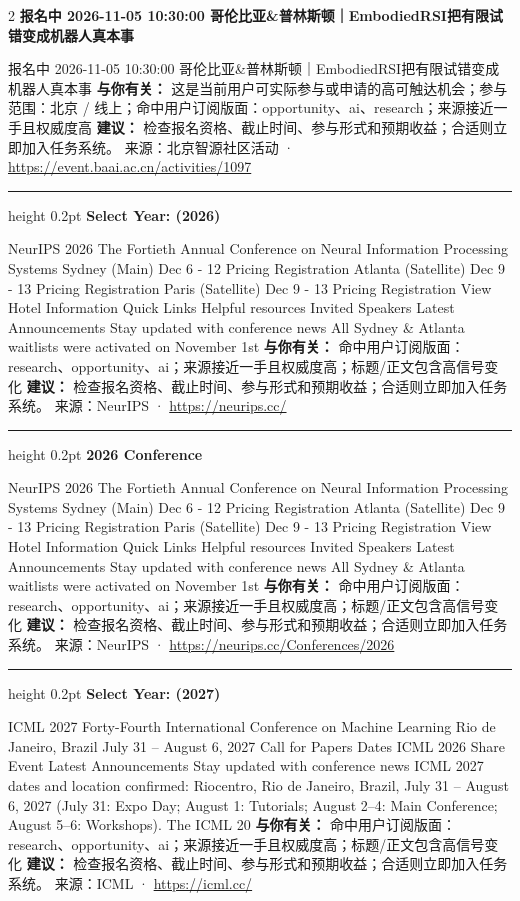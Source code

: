 \documentclass[10.5pt]{ctexart}
\begin{document}
\begin{multicols}{2}
{\large\bfseries 报名中 2026-11-05 10:30:00 哥伦比亚\&普林斯顿｜EmbodiedRSI把有限试错变成机器人真本事}\par
报名中 2026-11-05 10:30:00 哥伦比亚\&普林斯顿｜EmbodiedRSI把有限试错变成机器人真本事
\textbf{与你有关：} 这是当前用户可实际参与或申请的高可触达机会；参与范围：北京 / 线上；命中用户订阅版面：opportunity、ai、research；来源接近一手且权威度高
\textbf{建议：} 检查报名资格、截止时间、参与形式和预期收益；合适则立即加入任务系统。
{\footnotesize\color{ormuted} 来源：北京智源社区活动 · \url{https://event.baai.ac.cn/activities/1097}}
\vspace{2mm}
\hrule height 0.2pt
\vspace{2mm}
{\large\bfseries Select Year: (2026)}\par
NeurIPS 2026 The Fortieth Annual Conference on Neural Information Processing Systems Sydney (Main) Dec 6 - 12 Pricing Registration Atlanta (Satellite) Dec 9 - 13 Pricing Registration Paris (Satellite) Dec 9 - 13 Pricing Registration View Hotel Information Quick Links Helpful resources Invited Speakers Latest Announcements Stay updated with conference news All Sydney \& Atlanta waitlists were activated on November 1st 
\textbf{与你有关：} 命中用户订阅版面：research、opportunity、ai；来源接近一手且权威度高；标题/正文包含高信号变化
\textbf{建议：} 检查报名资格、截止时间、参与形式和预期收益；合适则立即加入任务系统。
{\footnotesize\color{ormuted} 来源：NeurIPS · \url{https://neurips.cc/}}
\vspace{2mm}
\hrule height 0.2pt
\vspace{2mm}
{\large\bfseries 2026 Conference}\par
NeurIPS 2026 The Fortieth Annual Conference on Neural Information Processing Systems Sydney (Main) Dec 6 - 12 Pricing Registration Atlanta (Satellite) Dec 9 - 13 Pricing Registration Paris (Satellite) Dec 9 - 13 Pricing Registration View Hotel Information Quick Links Helpful resources Invited Speakers Latest Announcements Stay updated with conference news All Sydney \& Atlanta waitlists were activated on November 1st 
\textbf{与你有关：} 命中用户订阅版面：research、opportunity、ai；来源接近一手且权威度高；标题/正文包含高信号变化
\textbf{建议：} 检查报名资格、截止时间、参与形式和预期收益；合适则立即加入任务系统。
{\footnotesize\color{ormuted} 来源：NeurIPS · \url{https://neurips.cc/Conferences/2026}}
\vspace{2mm}
\hrule height 0.2pt
\vspace{2mm}
{\large\bfseries Select Year: (2027)}\par
ICML 2027 Forty-Fourth International Conference on Machine Learning Rio de Janeiro, Brazil July 31 – August 6, 2027 Call for Papers Dates ICML 2026 Share Event Latest Announcements Stay updated with conference news ICML 2027 dates and location confirmed: Riocentro, Rio de Janeiro, Brazil, July 31 – August 6, 2027 (July 31: Expo Day; August 1: Tutorials; August 2–4: Main Conference; August 5–6: Workshops). The ICML 20
\textbf{与你有关：} 命中用户订阅版面：research、opportunity、ai；来源接近一手且权威度高；标题/正文包含高信号变化
\textbf{建议：} 检查报名资格、截止时间、参与形式和预期收益；合适则立即加入任务系统。
{\footnotesize\color{ormuted} 来源：ICML · \url{https://icml.cc/}}
\end{multicols}
\end{document}
